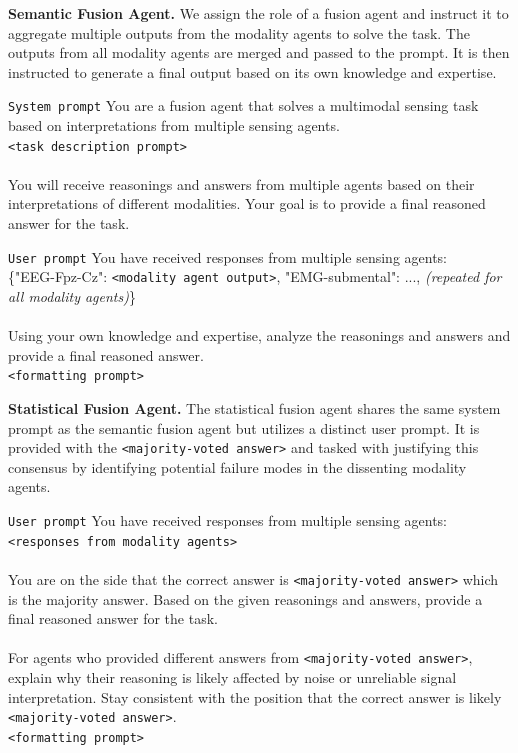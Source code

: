 \noindent \textbf{Semantic Fusion Agent.} We assign the role of a fusion agent and instruct it to aggregate multiple outputs from the modality agents to solve the task. The outputs from all modality agents are merged and passed to the prompt. It is then instructed to generate a final output based on its own knowledge and expertise.

\begin{promptbox}{\texttt{System prompt}}
You are a fusion agent that solves a multimodal sensing task based on interpretations from multiple sensing agents. \\
\texttt{<task description prompt>} \\ \\
You will receive reasonings and answers from multiple agents based on their interpretations of different modalities.
Your goal is to provide a final reasoned answer for the task.
\end{promptbox}

\begin{promptbox}{\texttt{User prompt}}
You have received responses from multiple sensing agents:\\
\{"EEG-Fpz-Cz": \texttt{<modality agent output>}, "EMG-submental": ..., \textit{(repeated for all modality agents)}\} \\ \\
Using your own knowledge and expertise, analyze the reasonings and answers and provide a final reasoned answer. \\
\texttt{<formatting prompt>}
\end{promptbox}

\noindent \textbf{Statistical Fusion Agent.} The statistical fusion agent shares the same system prompt as the semantic fusion agent but utilizes a distinct user prompt. It is provided with the \texttt{<majority-voted answer>} and tasked with justifying this consensus by identifying potential failure modes in the dissenting modality agents.

\begin{promptbox}{\texttt{User prompt}}
You have received responses from multiple sensing agents:\\
\texttt{<responses from modality agents>} \\ \\
You are on the side that the correct answer is \texttt{<majority-voted answer>} which is the majority answer.
Based on the given reasonings and answers, provide a final reasoned answer for the task. \\ \\
For agents who provided different answers from \texttt{<majority-voted answer>}, explain why their reasoning is likely affected by noise or unreliable signal interpretation. 
Stay consistent with the position that the correct answer is likely \texttt{<majority-voted answer>}. \\
\texttt{<formatting prompt>}
\end{promptbox}


